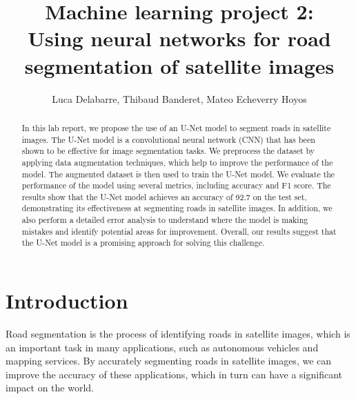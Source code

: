 \documentclass[10pt,conference,compsocconf]{IEEEtran}
\begin{document}
\title{\Large{Machine learning project 2:\\
Using neural networks for road segmentation of satellite images}}

\author{Luca Delabarre, Thibaud Banderet, Mateo Echeverry Hoyos}

\maketitle

\begin{abstract}
In this lab report, we propose the use of an U-Net model to segment roads in satellite images. The U-Net model is a convolutional neural network (CNN) that has been shown to be effective for image segmentation tasks. We preprocess the dataset by applying data augmentation techniques, which help to improve the performance of the model. The augmented dataset is then used to train the U-Net model. We evaluate the performance of the model using several metrics, including accuracy and F1 score. The results show that the U-Net model achieves an accuracy of 92.7 on the test set, demonstrating its effectiveness at segmenting roads in satellite images. In addition, we also perform a detailed error analysis to understand where the model is making mistakes and identify potential areas for improvement. Overall, our results suggest that the U-Net model is a promising approach for solving this challenge.
\end{abstract}

\section{Introduction}
Road segmentation is the process of identifying roads in satellite images, which is an important task in many applications, such as autonomous vehicles and mapping services. By accurately segmenting roads in satellite images, we can improve the accuracy of these applications, which in turn can have a significant impact on the world.
\end{document}
